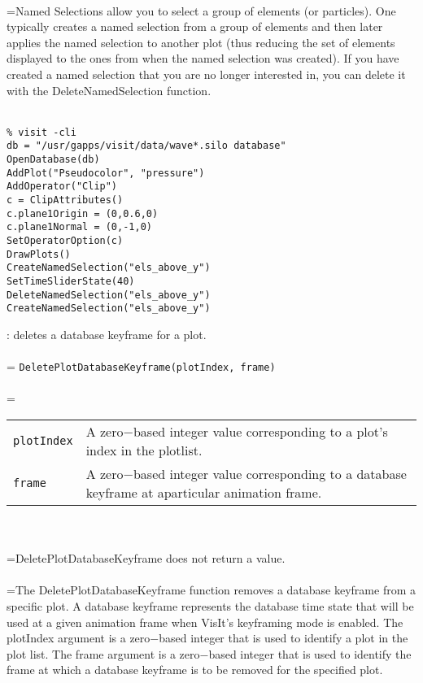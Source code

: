 \documentclass[10pt,a4paper]{report}
\begin{document}
 \\ 
\hangindent=\parindent Named Selections allow you to select a group of elements (or particles). One typically creates a named selection from a group of elements and then later applies the named selection to another plot (thus reducing the set of elements displayed to the ones from when the named selection was created).  If you have created a named selection that you are no longer interested in, you can delete it with the DeleteNamedSelection function. \\[-3mm] 

\\[-6mm]
\begin{verbatim}% visit -cli
db = "/usr/gapps/visit/data/wave*.silo database"
OpenDatabase(db)
AddPlot("Pseudocolor", "pressure")
AddOperator("Clip")
c = ClipAttributes()
c.plane1Origin = (0,0.6,0)
c.plane1Normal = (0,-1,0)
SetOperatorOption(c)
DrawPlots()
CreateNamedSelection("els_above_y")
SetTimeSliderState(40)
DeleteNamedSelection("els_above_y")
CreateNamedSelection("els_above_y")
\end{verbatim}
\newpage


{}
: deletes a database keyframe for a plot.\\[-3mm]

 \\ 
\hangindent=\parindent 
\verb!DeletePlotDatabaseKeyframe(plotIndex, frame)!\\ [-3mm]

 \\ 
\hangindent=\parindent 
\begin{tabular}{lp{9cm}}
\verb!plotIndex! & A zero$-$based integer value corresponding to a plot's index in the plotlist. \\
\verb!frame! & A zero$-$based integer value corresponding to a database keyframe at aparticular animation frame. \\
\end{tabular} \\[-2mm]


 \\ 
\hangindent=\parindent DeletePlotDatabaseKeyframe does not return a value. \\[-3mm] 

 \\ 
\hangindent=\parindent The DeletePlotDatabaseKeyframe function removes a database keyframe from a specific plot. A database keyframe represents the database time state that will be used at a given animation frame when VisIt's keyframing mode is enabled. The plotIndex argument is a zero$-$based integer that is used to identify a plot in the plot list. The frame argument is a zero$-$based integer that is used to identify the frame at which a database keyframe is to be removed for the specified plot. \\[-3mm] 
\end{document}
